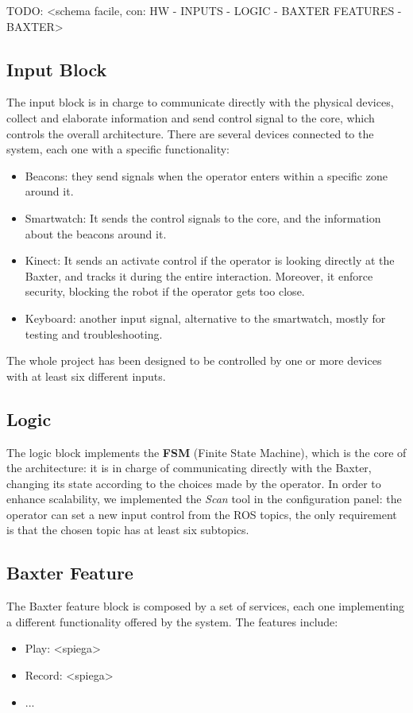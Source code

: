\documentclass[12pt]{article}
\begin{document}
{TODO: <schema facile, con: HW - INPUTS - LOGIC - BAXTER FEATURES - BAXTER>

\subsection{Input Block}
The input block is in charge to communicate directly with the physical devices, collect and elaborate information and send control signal to the core, which controls the overall architecture.
\newline
There are several devices connected to the system, each one with a specific functionality:
\begin{itemize}
\item Beacons: they send signals when the operator enters within a specific zone around it.
\item Smartwatch: It sends the control signals to the core, and the information about the beacons around it.
\item Kinect: It sends an activate control if the operator is looking directly at the Baxter, and tracks it during the entire interaction. Moreover, it enforce security, blocking the robot if the operator gets too close.
\item Keyboard: another input signal, alternative to the smartwatch, mostly for testing and troubleshooting.
\end{itemize}
The whole project has been designed to be controlled by one or more devices with at least six different inputs.

\subsection{Logic}
The logic block implements the \textbf{FSM} (Finite State Machine), which is the core of the architecture: it is in charge of communicating directly with the Baxter, changing its state according to the choices made by the operator.
\newline
In order to enhance scalability, we implemented the \textit{Scan} tool in the configuration panel: the operator can set a new input control from the ROS topics, the only requirement is that the chosen topic has at least six subtopics.

\subsection{Baxter Feature}
The Baxter feature block is composed by a set of services, each one implementing a different functionality offered by the system.
The features include:
\begin{itemize}
\item Play: <spiega>
\item Record: <spiega>
\item ...
\end{itemize}

}
\end{document}

